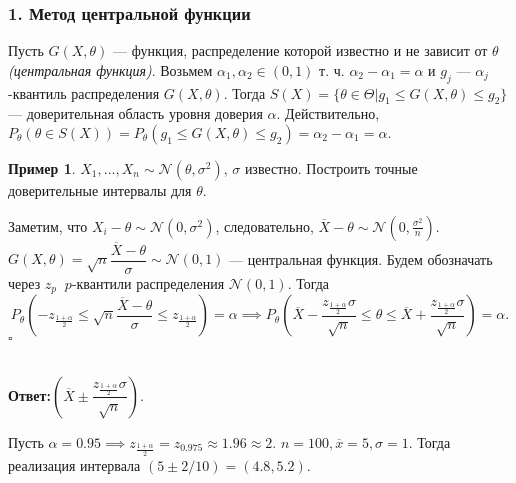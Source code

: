 \documentclass[12pt]{report}
\newenvironment{solution}{{\bfseries Решение:}}{$\square$\\\\}
\theoremstyle{definition}
\newtheorem{example}{Пример}
\begin{document}
\subsubsection{1. Метод центральной функции}
Пусть $G(X, \theta)$ — функция, распределение которой известно и не зависит от $\theta$ \emph{(центральная функция)}. Возьмем $\alpha_1, \alpha_2 \in (0, 1)$ т. ч. $\alpha_2 -\alpha_1 = \alpha$ и $g_j$ — $\alpha_j$-квантиль распределения $G(X, \theta)$. Тогда $S(X) = \{\theta \in \Theta \vert g_1 \leqslant G(X, \theta) \leqslant g_2 \}$ — доверительная область уровня доверия $\alpha$.  
Действительно, $P_\theta(\theta \in S(X)) = P_\theta(g_1 \leqslant G(X, \theta) \leqslant g_2) = \alpha_2 - \alpha_1 = \alpha.$  

\begin{example}
	$X_1, \dots, X_n \sim \mathcal{N}(\theta, \sigma^2)$, $\sigma$ известно. Построить точные доверительные интервалы для $\theta$.  
\end{example}
\begin{solution}
	Заметим, что $X_i - \theta \sim \mathcal{N}(0, \sigma^2)$, следовательно, $\overline{X} - \theta \sim \mathcal{N}(0, \frac{\sigma^2}{n}).$  
$G(X, \theta) = \sqrt{n}\dfrac{\overline{X} - \theta}{\sigma} \sim \mathcal{N}(0, 1)$ — центральная функция. Будем обозначать через $z_p$ $\ p$-квантили распределения $\mathcal{N}(0, 1)$. Тогда 
$$ P_\theta\left(-z_{\frac{1+\alpha}{2}} \leqslant\sqrt{n}\dfrac{\overline{X} - \theta}{\sigma} \leqslant  z_{\frac{1+\alpha}{2}} \right) = \alpha \implies P_\theta \left(\overline{X} - \dfrac{z_{\frac{1+\alpha}{2}}  \sigma}{\sqrt{n}} \leqslant \theta \leqslant \overline{X} + \dfrac{z_{\frac{1+\alpha}{2}}  \sigma}{\sqrt{n}} \right) = \alpha.
$$
\end{solution}

\textbf{Ответ:}$\left(\overline{X} \pm \dfrac{z_{\frac{1+\alpha}{2}} \sigma}{\sqrt{n}}\right)$.

Пусть $\alpha = 0.95 \implies z_{\frac{1+\alpha}{2}} = z_{0.975} \approx 1.96 \approx 2$. $n = 100, \overline{x} = 5, \sigma=1$. Тогда реализация интервала $(5 \pm 2/10) = (4.8, 5.2).$
\end{document}
